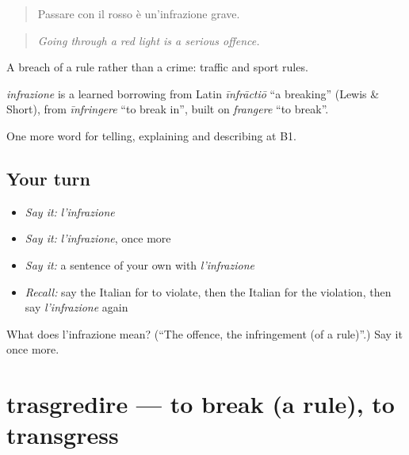 \begin{quote}
Passare con il rosso è un'infrazione grave.
\end{quote}

\begin{quote}
\emph{Going through a red light is a serious offence.}
\end{quote}

A breach of a rule rather than a crime: traffic and sport rules.

\begin{cousinweb}
\emph{infrazione} is a learned borrowing from Latin \emph{īnfrāctiō} \textquotedblleft{}a breaking\textquotedblright{} (Lewis \& Short), from \emph{īnfringere} \textquotedblleft{}to break in\textquotedblright{}, built on \emph{frangere} \textquotedblleft{}to break\textquotedblright{}.
\end{cousinweb}

\begin{grammarlens}[title={What you've built}]
One more word for telling, explaining and describing at B1.
\end{grammarlens}

\subsection*{Your turn}
\begin{itemize}
\raggedright
  \item \emph{Say it:} \emph{l'infrazione}
  \item \emph{Say it:} \emph{l'infrazione}, once more
  \item \emph{Say it:} a sentence of your own with \emph{l'infrazione}
  \item \emph{Recall:} say the Italian for to violate, then the Italian for the violation, then say \emph{l'infrazione} again
\end{itemize}

\begin{tcolorbox}[breakable,colback=teal!4,colframe=teal!35!black,title={Before you move on}]
What does l'infrazione mean? (\textquotedblleft{}The offence, the infringement (of a rule)\textquotedblright{}.) Say it once more.
\end{tcolorbox}
\section[trasgredire]{trasgredire — to break (a rule), to transgress}

\label{lesson:IT-C386-trasgredire}



